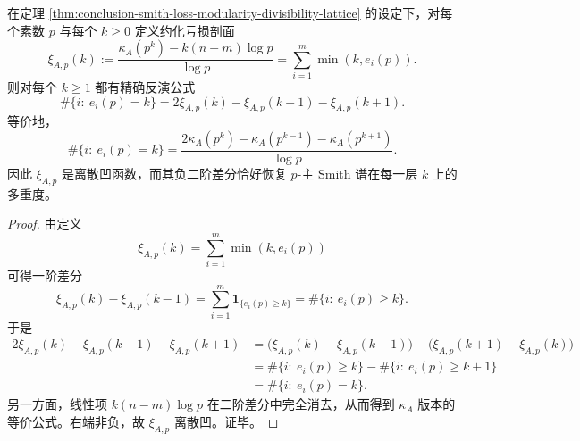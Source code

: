 \begin{theorem}\label{thm:conclusion-smith-primepower-hessian-inversion}
在定理 \ref{thm:conclusion-smith-loss-modularity-divisibility-lattice} 的设定下，对每个素数 \(p\) 与每个 \(k\ge 0\) 定义约化亏损剖面
\[
\xi_{A,p}(k)
:=
\frac{\kappa_A(p^k)-k(n-m)\log p}{\log p}
=
\sum_{i=1}^{m}\min(k,e_i(p)).
\]
则对每个 \(k\ge 1\) 都有精确反演公式
\[
\boxed{\;
\#\{i:\ e_i(p)=k\}
=
2\xi_{A,p}(k)-\xi_{A,p}(k-1)-\xi_{A,p}(k+1).\;}
\]
等价地，
\[
\boxed{\;
\#\{i:\ e_i(p)=k\}
=
\frac{2\kappa_A(p^k)-\kappa_A(p^{k-1})-\kappa_A(p^{k+1})}{\log p}.\;}
\]
因此 \(\xi_{A,p}\) 是离散凹函数，而其负二阶差分恰好恢复 \(p\)-主 Smith 谱在每一层 \(k\) 上的多重度。
\end{theorem}
\begin{proof}
由定义
\[
\xi_{A,p}(k)=\sum_{i=1}^{m}\min(k,e_i(p))
\]
可得一阶差分
\[
\xi_{A,p}(k)-\xi_{A,p}(k-1)
=
\sum_{i=1}^{m}\mathbf 1_{\{e_i(p)\ge k\}}
=
\#\{i:\ e_i(p)\ge k\}.
\]
于是
\[
\begin{aligned}
2\xi_{A,p}(k)-\xi_{A,p}(k-1)-\xi_{A,p}(k+1)
&=
\bigl(\xi_{A,p}(k)-\xi_{A,p}(k-1)\bigr)
-\bigl(\xi_{A,p}(k+1)-\xi_{A,p}(k)\bigr)\\
&=
\#\{i:\ e_i(p)\ge k\}-\#\{i:\ e_i(p)\ge k+1\}\\
&=
\#\{i:\ e_i(p)=k\}.
\end{aligned}
\]
另一方面，线性项 \(k(n-m)\log p\) 在二阶差分中完全消去，从而得到 \(\kappa_A\) 版本的等价公式。右端非负，故 \(\xi_{A,p}\) 离散凹。证毕。
\end{proof}

